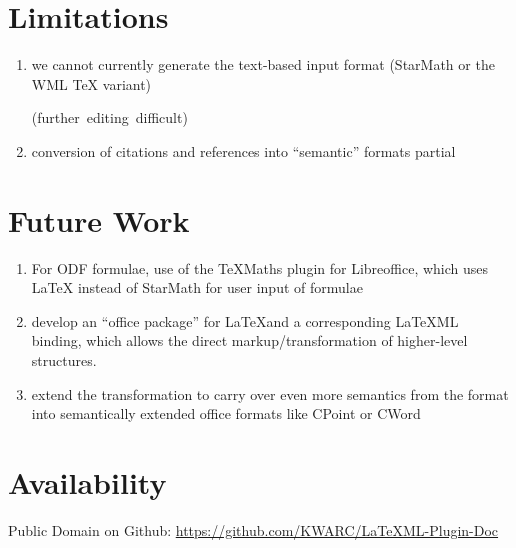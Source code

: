 \documentclass[a0,landscape]{a0poster}
\def\latexml{{\LaTeX}ML\xspace}
\def\lec#1{\strut\hfil\strut\null\nobreak\hfill\hbox{(#1)}\par}
\begin{document}
\begin{multicols}{3}
\section*{Limitations}
\begin{enumerate}
\item we cannot currently generate the text-based input format (StarMath or the WML {\TeX}
  variant)\lec{further editing difficult}
\item conversion of citations and references into ``semantic'' formats partial
\end{enumerate}

\section*{Future Work}
\begin{enumerate}
\item For ODF formulae, use of the TeXMaths plugin for Libreoffice, which uses {\LaTeX}
  instead of StarMath for user input of formulae
\item develop an ``office package'' for \LaTeX and a corresponding \latexml binding, which
  allows the direct markup/transformation of higher-level structures.
\item extend the transformation to carry over even more semantics from the \stex format
  into semantically extended office formats like CPoint or CWord
\end{enumerate}

\section*{Availability}
Public Domain on Github: \url{https://github.com/KWARC/LaTeXML-Plugin-Doc}
\end{multicols}
\end{document}
